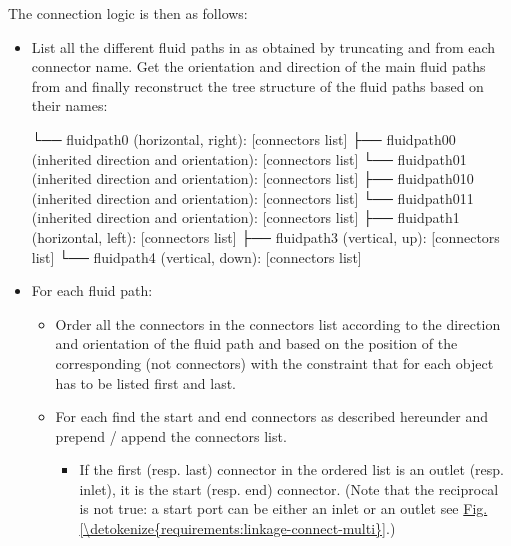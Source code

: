 \documentclass[letterpaper,10pt, openany,english]{sphinxmanual}
\begin{document}
The connection logic is then as follows:
\begin{itemize}
\item {} 
List all the different fluid paths in  as obtained by truncating  and  from each connector name. Get the orientation and direction of the main fluid paths from  and finally reconstruct the tree structure of the fluid paths based on their names:

\begin{sphinxVerbatim}[commandchars=\\\{\}]
└── fluid\PYGZus{}path0 (horizontal, right): [connectors list]
    ├── fluid\PYGZus{}path0\PYGZus{}0 (inherited direction and orientation): [connectors list]
    └── fluid\PYGZus{}path0\PYGZus{}1 (inherited direction and orientation): [connectors list]
        ├── fluid\PYGZus{}path0\PYGZus{}1\PYGZus{}0 (inherited direction and orientation): [connectors list]
        └── fluid\PYGZus{}path0\PYGZus{}1\PYGZus{}1 (inherited direction and orientation): [connectors list]
├── fluid\PYGZus{}path1 (horizontal, left): [connectors list]
├── fluid\PYGZus{}path3 (vertical, up): [connectors list]
└── fluid\PYGZus{}path4 (vertical, down): [connectors list]
\end{sphinxVerbatim}

\item {} 
For each fluid path:
\begin{itemize}
\item {} 
Order all the connectors in the connectors list according to the direction and orientation of the fluid path and based on the position of the corresponding  (not connectors) with the constraint that for each object  has to be listed first and  last.

\item {} 
For each  find the start and end connectors as described hereunder and prepend / append the connectors list.
\begin{itemize}
\item {} 
If the first (resp. last) connector in the ordered list is an outlet (resp. inlet), it is the start (resp. end) connector. (Note that the reciprocal is not true: a start port can be either an inlet or an outlet see \hyperref[\detokenize{requirements:linkage-connect-multi}]{Fig.\@ \ref{\detokenize{requirements:linkage-connect-multi}}}.)


\end{itemize}
\end{itemize}
\end{itemize}
\end{document}
